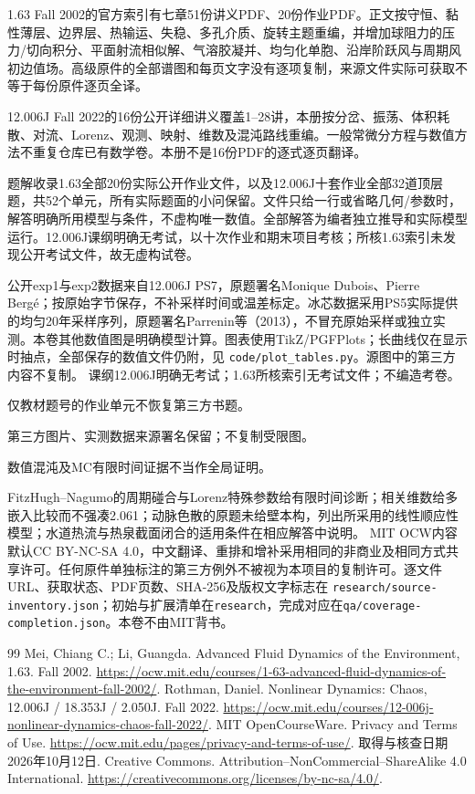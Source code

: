 1.63 Fall 2002的官方索引有七章51份讲义PDF、20份作业PDF。正文按守恒、黏性薄层、边界层、热输运、失稳、多孔介质、旋转主题重编，并增加球阻力的压力/切向积分、平面射流相似解、气溶胶凝并、均匀化单胞、沿岸阶跃风与周期风初边值场。高级原件的全部谱图和每页文字没有逐项复制，来源文件实际可获取不等于每份原件逐页全译。

12.006J Fall 2022的16份公开详细讲义覆盖1--28讲，本册按分岔、振荡、体积耗散、对流、Lorenz、观测、映射、维数及混沌路线重编。一般常微分方程与数值方法不重复仓库已有数学卷。本册不是16份PDF的逐式逐页翻译。

题解收录1.63全部20份实际公开作业文件，以及12.006J十套作业全部32道顶层题，共52个单元，所有实际题面的小问保留。文件只给一行或省略几何/参数时，解答明确所用模型与条件，不虚构唯一数值。全部解答为编者独立推导和实际模型运行。12.006J课纲明确无考试，以十次作业和期末项目考核；所核1.63索引未发现公开考试文件，故无虚构试卷。

公开exp1与exp2数据来自12.006J PS7，原题署名Monique Dubois、Pierre Bergé；按原始字节保存，不补采样时间或温差标定。冰芯数据采用PS5实际提供的均匀20年采样序列，原题署名Parrenin等（2013），不冒充原始采样或独立实测。本卷其他数值图是明确模型计算。图表使用TikZ/PGFPlots；长曲线仅在显示时抽点，全部保存的数值文件仍附，见 \texttt{code/plot\_tables.py}。源图中的第三方内容不复制。
课纲12.006J明确无考试；1.63所核索引无考试文件；不编造考卷。\par
仅教材题号的作业单元不恢复第三方书题。\par
第三方图片、实测数据来源署名保留；不复制受限图。\par
数值混沌及MC有限时间证据不当作全局证明。\par
FitzHugh--Nagumo的周期碰合与Lorenz特殊参数给有限时间诊断；相关维数给多嵌入比较而不强凑2.061；动脉色散的原题未给壁本构，列出所采用的线性顺应性模型；水道热流与热泉截面闭合的适用条件在相应解答中说明。
MIT OCW内容默认CC BY-NC-SA 4.0，中文翻译、重排和增补采用相同的非商业及相同方式共享许可。任何原件单独标注的第三方例外不被视为本项目的复制许可。逐文件URL、获取状态、PDF页数、SHA-256及版权文字标志在 \texttt{research/source-inventory.json}；初始与扩展清单在\texttt{research}，完成对应在\texttt{qa/coverage-completion.json}。本卷不由MIT背书。
\begin{thebibliography}{99}
 Mei, Chiang C.; Li, Guangda. Advanced Fluid Dynamics of the Environment, 1.63. Fall 2002. \url{https://ocw.mit.edu/courses/1-63-advanced-fluid-dynamics-of-the-environment-fall-2002/}.
 Rothman, Daniel. Nonlinear Dynamics: Chaos, 12.006J / 18.353J / 2.050J. Fall 2022. \url{https://ocw.mit.edu/courses/12-006j-nonlinear-dynamics-chaos-fall-2022/}.
 MIT OpenCourseWare. Privacy and Terms of Use. \url{https://ocw.mit.edu/pages/privacy-and-terms-of-use/}. 取得与核查日期2026年10月12日.
 Creative Commons. Attribution--NonCommercial--ShareAlike 4.0 International. \url{https://creativecommons.org/licenses/by-nc-sa/4.0/}.
\end{thebibliography}
